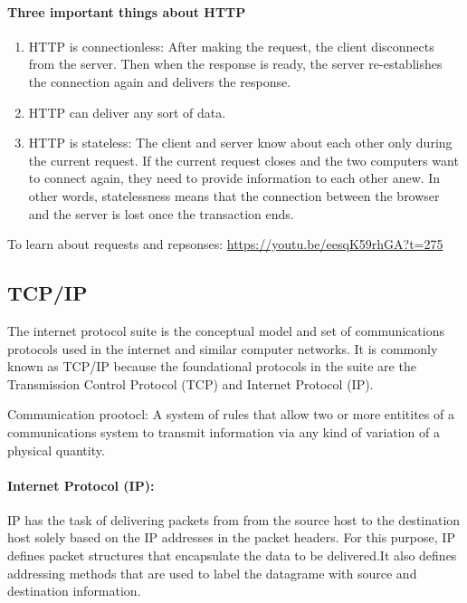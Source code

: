 \paragraph*{Three important things about HTTP} 
\begin{enumerate}
	\item HTTP is connectionless: After making the request, the client disconnects from the server. Then when the response is ready, the server re-establishes the connection again and delivers the response. 
	\item HTTP can deliver any sort of data. 
	\item HTTP is stateless: The client and server know about each other only during the current request. If the current request closes and the two computers want to connect again, they need to provide information to each other anew. In other words, statelessness means that the connection between the browser and the server is lost once the transaction ends.  
\end{enumerate}

To learn about requests and repsonses: \url{https://youtu.be/eesqK59rhGA?t=275}



\subsection{TCP/IP}

The internet protocol suite is the conceptual model and set of communications protocols used in the internet and similar computer networks. It is commonly known as TCP/IP because the foundational protocols in the suite are the Transmission Control Protocol (TCP) and Internet Protocol (IP). 

Communication prootocl: A system of rules that allow two or more entitites of a communications system to transmit information via any kind of variation of a physical quantity. 

\paragraph*{Internet Protocol (IP):} IP has the task of delivering packets from from the source host to the destination host solely based on the IP addresses in the packet headers. For this purpose, IP defines packet structures that encapsulate the data to be delivered.It also defines addressing methods that are used to label the datagrame with source and destination information. 

